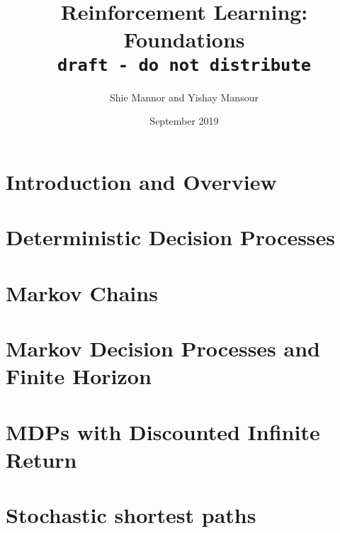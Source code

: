 \documentclass[12pt]{book}
\title{Reinforcement Learning: Foundations\\{\normalsize \tt draft - do not distribute}}
\date{September 2019}                                           %
\author{Shie Mannor and Yishay Mansour}
\begin{document}
\maketitle

\tableofcontents

\chapter{Introduction and Overview}
\label{chapter:intro}
%

\chapter{Deterministic Decision Processes}
\label{chapter:DDP}


%
%

\chapter{Markov Chains}
\label{chapter:MC}


\chapter{Markov Decision Processes and Finite Horizon}
\label{chapter:MDP-FH}



%
%

\chapter{MDPs with Discounted Infinite Return}
\label{chapter:disc}

%

\chapter{Stochastic shortest paths}
\label{chapter:ssp}
%
\end{document}
